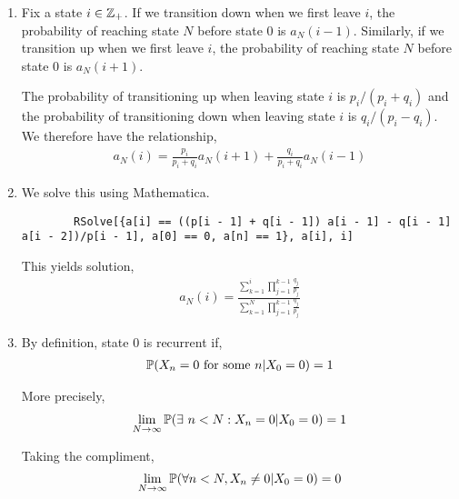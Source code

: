 \begin{solution}[Solution]
\begin{enumerate}[label=(\alph*)]
    \item Fix a state \( i\in\mathbb{Z}_{+} \). If we transition down when we first leave \( i \), the probability of reaching state \( N \) before state 0 is \( a_N(i-1) \). Similarly, if we transition up when we first leave \( i \), the probability of reaching state \( N \) before state 0 is \( a_N(i+1) \). 
        
    The probability of transitioning up when leaving state \( i \) is \( p_i / (p_i+q_i) \) and the probability of transitioning down when leaving state \( i \) is \( q_i / (p_i-q_i) \). We therefore have the relationship,
    \begin{align*}
        a_N(i) = \frac{p_i}{p_i+q_i} a_N(i+1) + \frac{q_i}{p_i+q_i}a_N(i-1)
    \end{align*}

    \item We solve this using Mathematica.
    \begin{lstlisting}
        RSolve[{a[i] == ((p[i - 1] + q[i - 1]) a[i - 1] - q[i - 1] a[i - 2])/p[i - 1], a[0] == 0, a[n] == 1}, a[i], i]
    \end{lstlisting}
    

        This yields solution,
        \begin{align*}
            a_N(i) = \frac{\sum_{k=1}^{i}\prod_{j=1}^{k-1} \frac{q_{j}}{p_{j}}}{\sum_{k=1}^{N}\prod_{j=1}^{k-1} \frac{q_{j}}{p_{j}}}
        \end{align*}
        

    \item

        \iffalse
        By definition, state \( 0 \) is recurrent if,
        \begin{align*}
            \mathbb{P}(X_n = 0\text{ for some } n | X_0 = 0) = 1 
        \end{align*}
        
        More precisely,
        \begin{align*}
            \lim_{N\to\infty} \mathbb{P}( \exists~ n < N: X_n = 0 | X_0=0) = 1
        \end{align*}
       
        Taking the compliment,
        \begin{align*}
            \lim_{N\to\infty} \mathbb{P}( \forall n < N, X_n \neq 0 | X_0 =0 ) = 0
        \end{align*}
       

\end{enumerate}
\end{solution}
